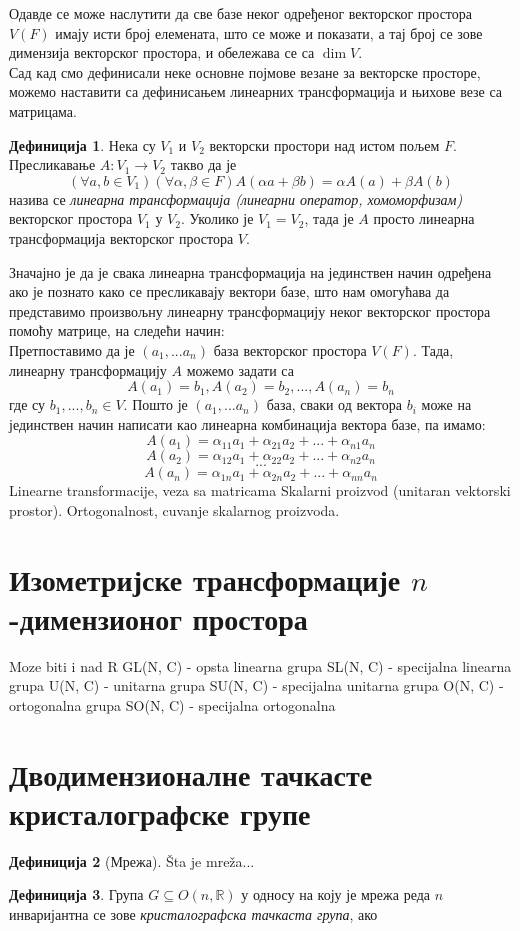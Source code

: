 \documentclass{report}
\theoremstyle{plain}
\theoremstyle{definition}
\newtheorem{defn}{Дефиниција}
\begin{document}
Одавде се може наслутити да све базе неког одређеног векторског простора $V(F)$ имају исти број елемената, што се може и показати, а тај број се зове димензија векторског простора, и обележава се са $\operatorname{dim} V$.\\
Сад кад смо дефинисали неке основне појмове везане за векторске просторе, можемо наставити са дефинисањем линеарних трансформација и њихове везе са матрицама.
\begin{defn}
Нека су $V_1$ и $V_2$ векторски простори над истом пољем $F$. Пресликавање $A: V_1\to V_2$ такво да је
$$(\forall a, b\in V_1)(\forall \alpha, \beta \in F) A(\alpha a+ \beta b) = \alpha A(a) + \beta A(b)$$
назива се \emph{линеарна трансформација (линеарни оператор, хомоморфизам)} векторског простора $V_1$ у $V_2$. Уколико је $V_1 = V_2$, тада је $A$ просто линеарна трансформација векторског простора $V$.
\end{defn}
Значајно је да је свака линеарна трансформација на јединствен начин одређена ако је познато како се пресликавају вектори базе, што нам омогућава да представимо произвољну линеарну трансформацију неког векторског простора помоћу матрице, на следећи начин:\\
Претпоставимо да је $(a_1, ...a_n)$ база векторског простора $V(F)$. Тада, линеарну трансформацију $A$ можемо задати са 
$$A(a_1) = b_1, A(a_2) = b_2, ..., A(a_n) = b_n$$
где су $b_1, ..., b_n\in V$. Пошто је $(a_1, ...a_n)$ база, сваки од вектора $b_i$ може на јединствен начин написати као линеарна комбинација вектора базе, па имамо:
$$A(a_1) = \alpha_{11}a_1 + \alpha_{21}a_2 + ... + \alpha_{n1}a_n$$
$$A(a_2) = \alpha_{12}a_1 + \alpha_{22}a_2 + ... + \alpha_{n2}a_n$$
$$...$$
$$A(a_n) = \alpha_{1n}a_1 + \alpha_{2n}a_2 + ... + \alpha_{nn}a_n$$
Linearne transformacije, veza sa matricama
Skalarni proizvod (unitaran vektorski prostor).
Ortogonalnost, cuvanje skalarnog proizvoda.
\section{Изометријске трансформације $n$-димензионог простора}
Moze biti i nad R
GL(N, C) - opsta linearna grupa
SL(N, C) - specijalna linearna grupa
U(N, C) - unitarna grupa
SU(N, C) - specijalna unitarna grupa
O(N, C) - ortogonalna grupa
SO(N, C) - specijalna ortogonalna
\section{Дводимензионалне тачкасте кристалографске групе}
\begin{defn}[Мрежа]
\v Sta je mre\v za...
\end{defn}
\begin{defn}
Група $G\subseteq O(n, \mathbb{R})$ у односу на коју је мрежа реда $n$ инваријантна се зове \emph{кристалографска тачкаста група}, ако
\end{defn}
\end{document}
